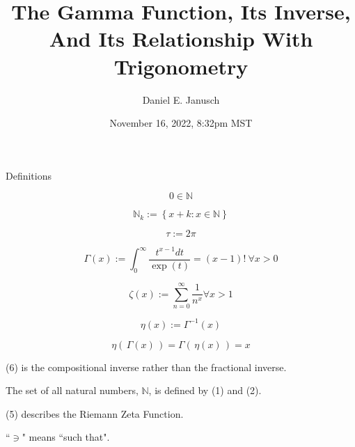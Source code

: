 \documentclass[12pt]{article}
\begin{document}
\title{The Gamma Function, Its Inverse, And Its Relationship With Trigonometry}
\author{Daniel E. Janusch}
\date{November 16, 2022, 8:32pm MST}
\maketitle

\begin{section}{Definitions}

	\begin{equation}
		0\in\mathbb N
	\end{equation}

	\begin{equation}
		\mathbb N_k:=\left\{x+k:x\in\mathbb N\right\}
	\end{equation}

	\begin{equation}
		\tau:=2\pi
	\end{equation}

	\begin{equation}
		\Gamma(x):=\int_0^\infty\dfrac{t^{x-1}dt}{\exp\left(t\right)}=(x-1)!~\forall x>0
	\end{equation}

	\begin{equation}
		\zeta(x):=\sum_{n=0}^\infty\dfrac1{n^x}\forall x>1
	\end{equation}

	\begin{equation}
		\eta(x):=\Gamma^{-1}(x)
	\end{equation}

	\begin{equation}
		\eta(\,\Gamma(x)\,)=\Gamma(\,\eta(x)\,)=x
	\end{equation}

	(6) is the compositional inverse rather than the fractional inverse.

	The set of all natural numbers, $\mathbb N$, is defined by (1) and (2).

	(5) describes the Riemann Zeta Function.

	``$\ni$" means ``such that".
\end{section}
\end{document}
